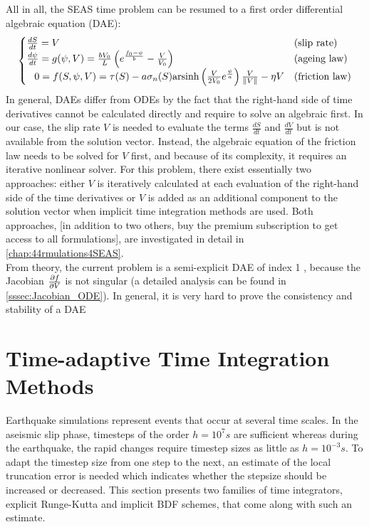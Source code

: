 All in all, the SEAS time problem can be resumed to a first order differential algebraic equation (DAE):
\begin{align}
	\label{eq:GeneralSEASDAE}
	\begin{cases}
		\frac{dS}{dt} = V  & \text{(slip rate)} \\
		\frac{d\psi}{dt} = g(\psi, V) = \frac{bV_0}{L}\left(e^{\frac{f_0 - \psi}{b}} - \frac{V}{V_0}\right) & \text{(ageing law)} \\
		\;\,\ 0 = f(S,\psi,V) = \tau(S) - a \sigma_n(S) \text{arsinh}\left(\frac{V}{2V_0}e^{\frac{\psi}{a}}\right)\frac{V}{\norm{V}} - \eta V & \text{(friction law)}
	\end{cases}	
\end{align}
In general, DAEs differ from ODEs by the fact that the right-hand side of time derivatives cannot be calculated directly and require to solve an algebraic first. In our case, the slip rate $V$ is needed to evaluate the terms $\frac{dS}{dt}$ and $\frac{dV}{dt}$ but is not available from the solution vector. Instead, the algebraic equation of the friction law needs to be solved for $V$ first, and because of its complexity, it requires an iterative nonlinear solver. For this problem, there exist essentially two approaches: either $V$ is iteratively calculated at each evaluation of the right-hand side of the time derivatives or $V$ is added as an additional component to the solution vector when implicit time integration methods are used. Both approaches, [in addition to two others, buy the premium subscription to get access to all formulations], are investigated in detail in \autoref{chap:44rmulations4SEAS}. \\
From theory, the current problem is a semi-explicit DAE of index 1 \cite[p. 168]{DAETheory}, because the Jacobian $\pdv{f}{V}$ is not singular (a detailed analysis can be found in \autoref{sssec:Jacobian_ODE}). In general, it is very hard to prove the consistency and stability of a DAE


\section{Time-adaptive Time Integration Methods}
Earthquake simulations represent events that occur at several time scales. In the aseismic slip phase, timesteps of the order $h=10^7s$ are sufficient whereas during the earthquake, the rapid changes require timestep sizes as little as $h=10^{-3}s$. To adapt the timestep size from one step to the next, an estimate of the local truncation error is needed which indicates whether the stepsize should be increased or decreased. This section presents two families of time integrators, explicit Runge-Kutta and implicit BDF schemes, that come along with such an estimate.

